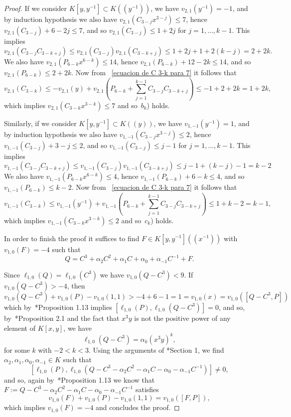 \documentclass[reqno,a4paper,twoside]{amsart}
\theoremstyle{definition}
\theoremstyle{remark}
\begin{document}
\begin{proof}
If we consider $K[y,y^{-1}]\subset K((y^{-1}))$, we have $v_{2,1}(y^{-1})=-1$,
and by induction hypothesis we also have $v_{2,1}(C_{3-j}x^{3-j})\le 7$, hence $v_{2,1}(C_{3-j})+6-2j\le 7$, and so $v_{2,1}(C_{3-j})\le 1+2j$ for $j=1,\dots ,k-1$.
This implies
$$
v_{2,1}(C_{3-j}C_{3-k+j})\le  v_{2,1}(C_{3-j}) v_{2,1}(C_{3-k+j})\le 1+2j+1+2(k-j)=2+2k.
$$
We also have $v_{2,1}(P_{6-k}x^{6-k})\le 14$, hence $v_{2,1}(P_{6-k})+12-2k\le 14$, and so $v_{2,1}(P_{6-k})\le 2+2k$.
Now from ~\eqref{ecuacion de C 3-k para 7} it follows that
$$
v_{2,1}(C_{3-k})\le -v_{2,1}(y)+v_{2,1}\left( P_{6-k}+\sum_{j=1}^{k-1}C_{3-j}C_{3-k+j}\right)\le -1+2+2k=1+2k,
$$
which implies $v_{2,1}(C_{3-k}x^{3-k})\le 7$ and so~$b_k$) holds.

Similarly, if we consider $K[y,y^{-1}]\subset K((y))$, we have $v_{1,-1}(y^{-1})=1$,
and by induction hypothesis we also have $v_{1,-1}(C_{3-j}x^{3-j})\le 2$, hence $v_{1,-1}(C_{3-j})+3-j\le 2$, and so $v_{1,-1}(C_{3-j})\le j-1$ for $j=1,\dots ,k-1$.
This implies
$$
v_{1,-1}(C_{3-j}C_{3-k+j})\le  v_{1,-1}(C_{3-j}) v_{1,-1}(C_{3-k+j})\le j-1+ (k-j)-1=k-2
$$
We also have $v_{1,-1}(P_{6-k}x^{6-k})\le 4$, hence $v_{1,-1}(P_{6-k})+6-k\le 4$, and so $v_{1,-1}(P_{6-k})\le k-2$.
Now from ~\eqref{ecuacion de C 3-k para 7} it follows that
$$
v_{1,-1}(C_{3-k})\le v_{1,-1}(y^{-1})+v_{1,-1}\left( P_{6-k}+\sum_{j=1}^{k-1}C_{3-j}C_{3-k+j}\right)\le 1+k-2=k-1,
$$
which implies $v_{1,-1}(C_{3-k}x^{3-k})\le 2$ and so~$c_k$) holds.

In order to finish the proof it suffices to find $F\in K[y,y^{-1}]((x^{-1}))$
with $v_{1,0}(F)=-4$ such that
\begin{equation}\label{igualdad para Q}
Q=C^3 +\alpha_2 C^2+\alpha_1 C+\alpha_0+\alpha_{-1}C^{-1}+F.
\end{equation}

Since $\ell_{1,0}(Q)=\ell_{1,0}(C^3)$ we have  $v_{1,0}(Q-C^3)<9$. If $v_{1,0}(Q-C^3)>-4$, then
$$
v_{1,0}(Q-C^3)+v_{1,0}(P)-v_{1,0}(1,1)>-4+6-1=1=v_{1,0}(x)= v_{1,0}([Q-C^3,P])
$$
which by~\cite{GGV1}*{Proposition 1.13} implies $[\ell_{1,0}(P), \ell_{1,0}(Q-C^3)]=0$, and so, by~\cite{GGV1}*{Proposition 2.1} and the fact that $x^3 y$ is not the positive
power of any element of $K[x,y]$, we have
$$
\ell_{1,0}(Q-C^3)=\alpha_k (x^3 y)^k,
$$
for some $k$ with $-2<k<3$. Using the arguments of \cite{GGV3}*{Section 1}, we find $\alpha_{2},\alpha_{1},\alpha_{0},\alpha_{-1}\in K$ such that
$$
[\ell_{1,0}(P), \ell_{1,0}(Q-C^3-\alpha_2 C^2-\alpha_1 C-\alpha_0-\alpha_{-1}C^{-1})]\ne 0,
$$
and so, again by~\cite{GGV1}*{Proposition 1.13} we know that  $F:=Q-C^3-\alpha_2 C^2-\alpha_1 C-\alpha_0-\alpha_{-1}C^{-1}$ satisfies
$$
v_{1,0}(F)+v_{1,0}(P)-v_{1,0}(1,1)=v_{1,0}([F,P]),
$$
which implies $v_{1,0}(F)=-4$ and concludes the proof.
\end{proof}
\end{document}
